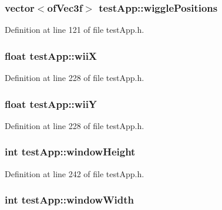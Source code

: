 \hypertarget{classtest_app_a5495d37f44bb3e3b00a04ad5910e0a6b}{
\subsubsection[{wiggle\-Positions}]{\setlength{\rightskip}{0pt plus 5cm}vector$<$of\-Vec3f$>$ test\-App\-::wiggle\-Positions}}\label{classtest_app_a5495d37f44bb3e3b00a04ad5910e0a6b}


Definition at line 121 of file test\-App.\-h.

\hypertarget{classtest_app_a7a77e8633c3a94e3e409a33a5cd9ae3f}{
\subsubsection[{wii\-X}]{\setlength{\rightskip}{0pt plus 5cm}float test\-App\-::wii\-X}}\label{classtest_app_a7a77e8633c3a94e3e409a33a5cd9ae3f}


Definition at line 228 of file test\-App.\-h.

\hypertarget{classtest_app_a5ae41896388ae16ee530beca5333e02a}{
\subsubsection[{wii\-Y}]{\setlength{\rightskip}{0pt plus 5cm}float test\-App\-::wii\-Y}}\label{classtest_app_a5ae41896388ae16ee530beca5333e02a}


Definition at line 228 of file test\-App.\-h.

\hypertarget{classtest_app_a4e8884eeef5b2657b62278969d4e3dcf}{
\subsubsection[{window\-Height}]{\setlength{\rightskip}{0pt plus 5cm}int test\-App\-::window\-Height}}\label{classtest_app_a4e8884eeef5b2657b62278969d4e3dcf}


Definition at line 242 of file test\-App.\-h.

\hypertarget{classtest_app_a9ed611377cd46f5148a3a3d538e96484}{
\subsubsection[{window\-Width}]{\setlength{\rightskip}{0pt plus 5cm}int test\-App\-::window\-Width}}\label{classtest_app_a9ed611377cd46f5148a3a3d538e96484}


